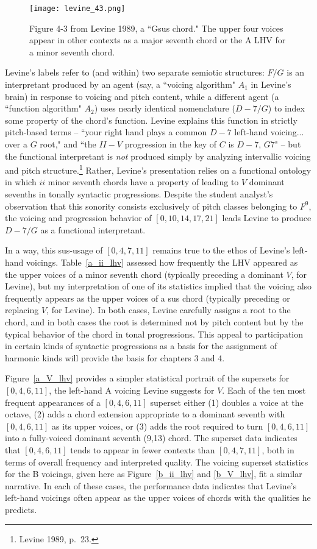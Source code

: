 \begin{figure}
	\centering
	\caption{Figure 4-3 from Levine 1989, a ``Gsus chord."  The upper four voices appear in other contexts as a major seventh chord or the A LHV for a minor seventh chord.}
	\texttt{[image: levine\_43.png]}
	\label{Gsus}
\end{figure}

Levine's labels refer to (and within) two separate semiotic structures: $F/G$ is an interpretant produced by an agent (say, a ``voicing algorithm" $A_1$ in Levine's brain) in response to voicing and pitch content, while a different agent (a ``function algorithm" $A_2$) uses nearly identical nomenclature ($D-7/G$) to index some property of the chord's function.  Levine explains this function in strictly pitch-based terms -- ``your right hand plays a common $D-7$ left-hand voicing... over a $G$ root," and ``the $II-V$ progression in the key of $C$ is $D-7$, $G7$" -- but the functional interpretant is \emph{not} produced simply by analyzing intervallic voicing and pitch structure.\footnote{Levine 1989, p.\ 23.}  Rather, Levine's presentation relies on a functional ontology in which $ii$ minor seventh chords have a property of leading to $V$ dominant sevenths in tonally syntactic progressions.   Despite the student analyst's observation that this sonority consists exclusively of pitch classes belonging to $F^9$, the voicing and progression behavior of $[0,10,14,17,21]$ leads Levine to produce $D-7/G$ as a functional interpretant.  

In a way, this sus-usage of $[0,4,7,11]$ remains true to the ethos of Levine's left-hand voicings.  Table~\ref{a_ii_lhv} assessed how frequently the LHV appeared as the upper voices of a minor seventh chord (typically preceding a dominant $V$, for Levine), but my interpretation of one of its statistics implied that the voicing also frequently appears as the upper voices of a sus chord (typically preceding or replacing $V$, for Levine).  In both cases, Levine carefully assigns a root to the chord, and in both cases the root is determined not by pitch content but by the typical behavior of the chord in tonal progressions.  This appeal to participation in certain kinds of syntactic progressions as a basis for the assignment of harmonic kinds will provide the basis for chapters 3 and 4.

Figure~\ref{a_V_lhv} provides a simpler statistical portrait of the supersets for $[0,4,6,11]$, the left-hand A voicing Levine suggests for $V$.  Each of the ten most frequent appearances of a $[0,4,6,11]$ superset either (1) doubles a voice at the octave, (2) adds a chord extension appropriate to a dominant seventh with $[0,4,6,11]$ as its upper voices, or (3) adds the root required to turn $[0,4,6,11]$ into a fully-voiced dominant seventh (9,13) chord.  The superset data indicates that $[0,4,6,11]$ tends to appear in fewer contexts than $[0,4,7,11]$, both in terms of overall frequency and interpreted quality.  The voicing superset statistics for the B voicings, given here as Figure~\ref{b_ii_lhv} and \ref{b_V_lhv}, fit a similar narrative.  In each of these cases, the performance data indicates that Levine's left-hand voicings often appear as the upper voices of chords with the qualities he predicts.

